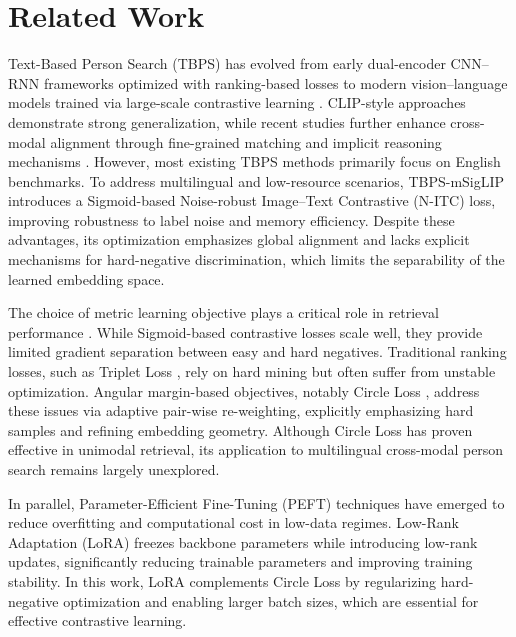 \documentclass[conference]{IEEEtran}
\begin{document}
\section{Related Work}\label{related}

Text-Based Person Search (TBPS) has evolved from early dual-encoder CNN–RNN frameworks optimized with ranking-based losses \cite{Zhang_2018_ECCV,Li_2017_CVPR} to modern vision--language models trained via large-scale contrastive learning \cite{pmlr-v139-radford21a}. CLIP-style approaches demonstrate strong generalization, while recent studies further enhance cross-modal alignment through fine-grained matching and implicit reasoning mechanisms \cite{jiang2023cross,yin2025cross}. However, most existing TBPS methods primarily focus on English benchmarks. To address multilingual and low-resource scenarios, TBPS-mSigLIP \cite{tran2025multilingual} introduces a Sigmoid-based Noise-robust Image--Text Contrastive (N-ITC) loss, improving robustness to label noise and memory efficiency. Despite these advantages, its optimization emphasizes global alignment and lacks explicit mechanisms for hard-negative discrimination, which limits the separability of the learned embedding space.

The choice of metric learning objective plays a critical role in retrieval performance \cite{kulis2013metric}. While Sigmoid-based contrastive losses scale well, they provide limited gradient separation between easy and hard negatives. Traditional ranking losses, such as Triplet Loss \cite{schroff2015facenet}, rely on hard mining but often suffer from unstable optimization. Angular margin-based objectives, notably Circle Loss \cite{sun2020circle}, address these issues via adaptive pair-wise re-weighting, explicitly emphasizing hard samples and refining embedding geometry. Although Circle Loss has proven effective in unimodal retrieval, its application to multilingual cross-modal person search remains largely unexplored.

In parallel, Parameter-Efficient Fine-Tuning (PEFT) techniques have emerged to reduce overfitting and computational cost in low-data regimes. Low-Rank Adaptation (LoRA) \cite{hu2022lora} freezes backbone parameters while introducing low-rank updates, significantly reducing trainable parameters and improving training stability. In this work, LoRA complements Circle Loss by regularizing hard-negative optimization and enabling larger batch sizes, which are essential for effective contrastive learning.
\end{document}
